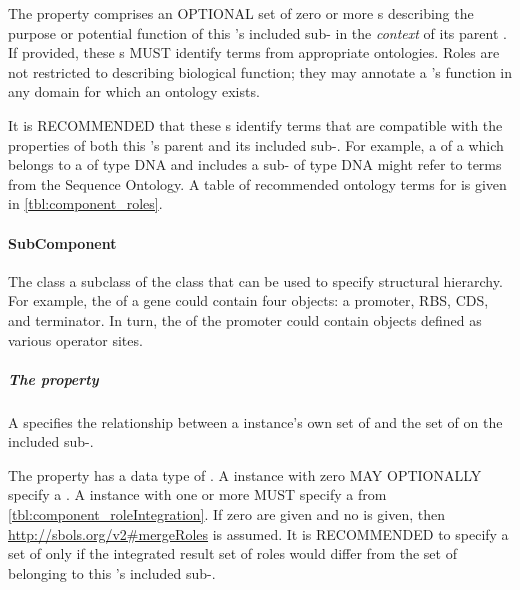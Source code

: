 The  property comprises an OPTIONAL set of zero or more  s describing the purpose or potential function of this 's included sub- in the \textit{context} of its parent .
If provided, these  s MUST identify terms from appropriate ontologies. Roles are not restricted to describing biological function; they may annotate a 's function in any domain for which an ontology exists.

It is RECOMMENDED that these  s identify terms that are compatible with the  properties of both this 's parent  and its included sub-. For example, a  of a  which belongs to a  of type DNA and includes a sub- of type DNA might refer to terms from the Sequence Ontology. A table of recommended ontology terms for  is given in \ref{tbl:component_roles}.

\paragraph{SubComponent}
\label{sec:SubComponent}

The  class a subclass of the  class that can be used to specify structural hierarchy. For example, the  of a gene could contain four  objects: a promoter, RBS, CDS, and terminator. In turn, the  of the promoter  could contain  objects defined as various operator sites.

\subparagraph{The  property}\label{sec:roleIntegration:C}


A  specifies the relationship between a  instance's own set of  and the set of  on the included sub-.

The  property has a data type of . A  instance with zero  MAY OPTIONALLY specify a . A  instance with one or more  MUST specify a  from \ref{tbl:component_roleIntegration}.
If zero   are given and no   is given, then \url{http://sbols.org/v2\#mergeRoles} is assumed.
It is RECOMMENDED to specify a set of   only if the integrated result set of roles would differ from the set of  belonging to this 's included sub-.


